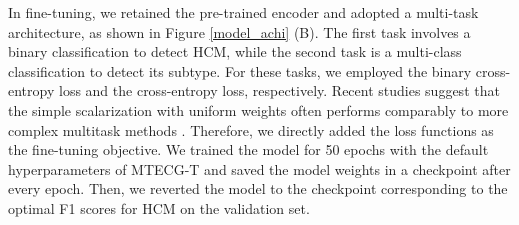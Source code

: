 \documentclass[11pt]{article}
\theoremstyle{definition}
\begin{document}
In fine-tuning, we retained the pre-trained encoder and adopted a multi-task architecture, as shown in Figure \ref{model_achi} (B). The first task involves a binary classification to detect HCM, while the second task is a multi-class classification to detect its subtype. For these tasks, we employed the binary cross-entropy loss and the cross-entropy loss, respectively. 
Recent studies suggest that the simple scalarization with uniform weights often performs comparably to more complex multitask methods \citep{royer2024scalarization}. 
Therefore, we directly added the loss functions as the fine-tuning objective. We trained the model for 50 epochs with the default hyperparameters of MTECG-T and saved the model weights in a checkpoint after every epoch. Then, we reverted the model to the checkpoint corresponding to the optimal F1 scores for HCM on the validation set.

%












\end{document}
